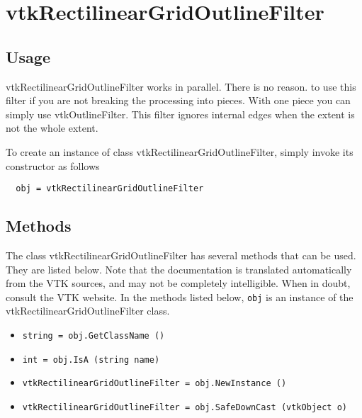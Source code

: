 \section{vtkRectilinearGridOutlineFilter}

\subsection{Usage}

 vtkRectilinearGridOutlineFilter works in parallel.  There is no reason.
 to use this filter if you are not breaking the processing into pieces.
 With one piece you can simply use vtkOutlineFilter.  This filter
 ignores internal edges when the extent is not the whole extent.

To create an instance of class vtkRectilinearGridOutlineFilter, simply
invoke its constructor as follows
\begin{verbatim}
  obj = vtkRectilinearGridOutlineFilter
\end{verbatim}
\subsection{Methods}

The class vtkRectilinearGridOutlineFilter has several methods that can be used.
  They are listed below.
Note that the documentation is translated automatically from the VTK sources,
and may not be completely intelligible.  When in doubt, consult the VTK website.
In the methods listed below, \verb|obj| is an instance of the vtkRectilinearGridOutlineFilter class.
\begin{itemize}
\item  \verb|string = obj.GetClassName ()|

\item  \verb|int = obj.IsA (string name)|

\item  \verb|vtkRectilinearGridOutlineFilter = obj.NewInstance ()|

\item  \verb|vtkRectilinearGridOutlineFilter = obj.SafeDownCast (vtkObject o)|

\end{itemize}

